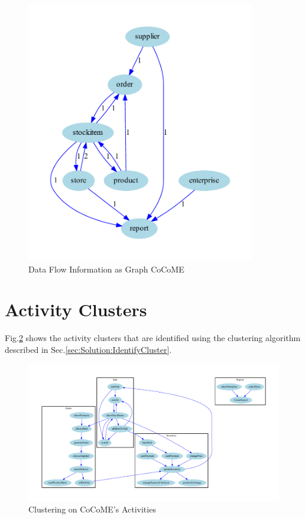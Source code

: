 \begin{figure}[h!]
	\centering
	\includegraphics[width=10cm, trim={1cm 0cm 2cm 0cm}]{img/CoCoMEDataFlowGraph.pdf}
	\caption{Data Flow Information as Graph CoCoME}
	\label{fig:CoCoMEDataFlowGraph}
\end{figure}

\pagebreak

\section{Activity Clusters}
Fig.\ref{fig:CoCoMEActivityCluster} shows the activity clusters that are identified using the clustering algorithm described in Sec.\ref{sec:Solution:IdentifyCluster}.

\begin{figure}[h!]
	\centering
	\begin{sideways}
		\includegraphics[width=19cm, trim={1.5cm 0cm 2cm 0cm}]{img/CoCoMEActivityCluster.pdf}
	\end{sideways}
	
	\caption{Clustering on CoCoME's Activities}
	\label{fig:CoCoMEActivityCluster}
\end{figure}



